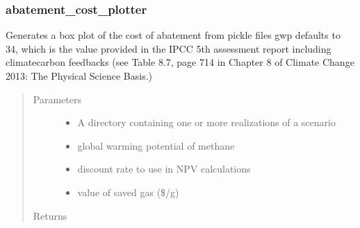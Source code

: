 \documentclass[letterpaper,10pt,english]{sphinxmanual}
\begin{document}
\subsubsection{abatement\_cost\_plotter}
\label{\detokenize{index:abatement-cost-plotter}}

\begin{fulllineitems}
\label{\detokenize{index:feast.ResultsProcessing.plotting_functions.abatement_cost_plotter}}
Generates a box plot of the cost of abatement from pickle files
gwp defaults to 34, which is the value provided in the IPCC 5th assessment report including climate\sphinxhyphen{}carbon feedbacks
(see Table 8.7, page 714 in Chapter 8 of Climate Change 2013: The Physical Science Basis.)
\begin{quote}\begin{description}
\item[{Parameters}] \leavevmode\begin{itemize}
\item {} 
 \textendash{} A directory containing one or more realizations of a scenario

\item {} 
 \textendash{} global warming potential of methane

\item {} 
 \textendash{} discount rate to use in NPV calculations

\item {} 
 \textendash{} value of saved gas (\$/g)

\end{itemize}

\item[{Returns}] \leavevmode


\end{description}\end{quote}

\end{fulllineitems}
\end{document}
